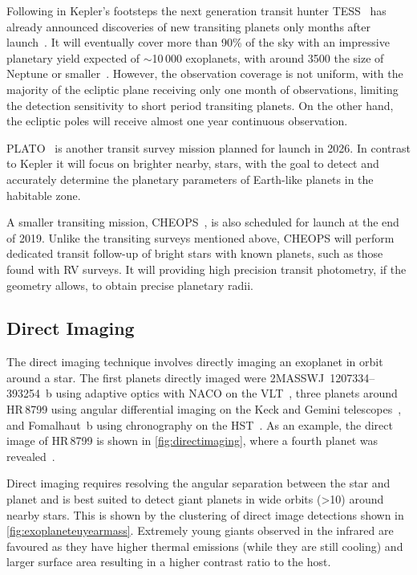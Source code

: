 Following in Kepler's footsteps the next generation transit hunter {TESS}~\citep{ricker_transiting_2015} has already announced discoveries of new transiting planets only months after launch~\citep{vanderspek_tess_2018, gandolfi_tess_2018, huang_tess_2018}.
It will eventually cover more than 90\% of the sky with an impressive planetary yield expected of \(\sim\)10\,000 exoplanets, with around 3500 the size of Neptune or smaller~\citep{barclay_revised_2018, huang_expected_2018}.
However, the observation coverage is not uniform, with the majority of the ecliptic plane receiving only one month of observations, limiting the detection sensitivity to short period transiting planets.
On the other hand, the ecliptic poles will receive almost one year continuous observation.

{PLATO}~\citep{rauer_plato_2014} is another transit survey mission planned for launch in 2026.
In contrast to Kepler it will focus on brighter nearby, stars, with the goal to detect and accurately determine the planetary parameters of Earth-like planets in the habitable zone.

A smaller transiting mission, {CHEOPS}~\citep{broeg_cheops_2013}, is also scheduled for launch at the end of 2019.
Unlike the transiting surveys mentioned above, {CHEOPS} will perform dedicated transit follow-up of bright stars with known planets, such as those found with {RV} surveys.
It will providing high precision transit photometry, if the geometry allows, to obtain precise planetary radii.


\subsection{Direct Imaging}
\label{subsec:direct_detection}
The direct imaging technique involves directly imaging an exoplanet in orbit around a star.
The first planets directly imaged were {2MASSWJ~1207334--393254~b} using adaptive optics with NACO on the VLT~\citep{chauvin_giant_2004}, three planets around HR\,8799 using angular differential imaging on the Keck and Gemini telescopes~\citep{marois_direct_2008}, and {Fomalhaut~b} using chronography on the HST~\citep{kalas_optical_2008}.
As an example, the direct image of {HR\,8799} is shown in \cref{fig:directimaging}, where a fourth planet was revealed~\citep{marois_images_2010}.

Direct imaging requires resolving the angular separation between the star and planet and is best suited to detect giant planets in wide orbits (>10\AU{}) around nearby stars.
This is shown by the clustering of direct image detections shown in \cref{fig:exoplaneteuyearmass}.
Extremely young giants observed in the infrared are favoured as they have higher thermal emissions (while they are still cooling) and larger surface area resulting in a higher contrast ratio to the host.


